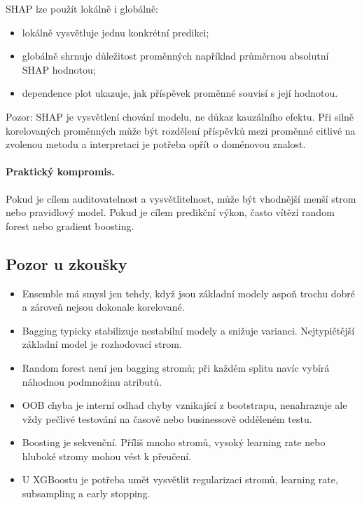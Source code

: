 SHAP lze použít lokálně i globálně:
\begin{itemize}
    \item lokálně vysvětluje jednu konkrétní predikci;
    \item globálně shrnuje důležitost proměnných například průměrnou absolutní SHAP hodnotou;
    \item dependence plot ukazuje, jak příspěvek proměnné souvisí s její hodnotou.
\end{itemize}

Pozor: SHAP je vysvětlení chování modelu, ne důkaz kauzálního efektu. Při silně korelovaných proměnných
může být rozdělení příspěvků mezi proměnné citlivé na zvolenou metodu a interpretaci je potřeba opřít
o doménovou znalost.

\paragraph{Praktický kompromis.}
Pokud je cílem auditovatelnost a vysvětlitelnost, může být vhodnější menší strom nebo pravidlový model. Pokud
je cílem predikční výkon, často vítězí random forest nebo gradient boosting.

\subsection{Pozor u zkoušky}

\begin{itemize}
    \item Ensemble má smysl jen tehdy, když jsou základní modely aspoň trochu dobré a zároveň nejsou dokonale
    korelované.
    \item Bagging typicky stabilizuje nestabilní modely a snižuje varianci. Nejtypičtější základní model je
    rozhodovací strom.
    \item Random forest není jen bagging stromů; při každém splitu navíc vybírá náhodnou podmnožinu atributů.
    \item OOB chyba je interní odhad chyby vznikající z bootstrapu, nenahrazuje ale vždy pečlivé testování na
    časově nebo businessově odděleném testu.
    \item Boosting je sekvenční. Příliš mnoho stromů, vysoký learning rate nebo hluboké stromy mohou vést k
    přeučení.
    \item U XGBoostu je potřeba umět vysvětlit regularizaci stromů, learning rate, subsampling a early stopping.
\end{itemize}


